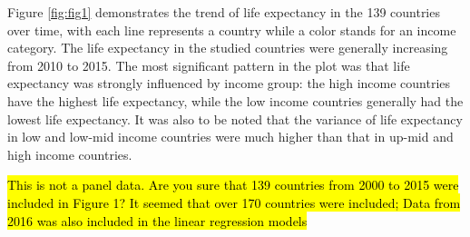 \documentclass[]{elsarticle} %
\begin{document}
Figure \ref{fig:fig1} demonstrates the trend of life expectancy in the 139 countries over time, with each line represents a country while a color stands for an income category. The life expectancy in the studied countries were generally increasing from 2010 to 2015. The most significant pattern in the plot was that life expectancy was strongly influenced by income group: the high income countries have the highest life expectancy, while the low income countries generally had the lowest life expectancy. It was also to be noted that the variance of life expectancy in low and low-mid income countries were much higher than that in up-mid and high income countries.

\begin{table}[t]

\caption{\label{tab:unnamed-chunk-2}Descrptive statistics (2000-2016)}
\centering
{}
\end{table}

\hl{This is not a panel data. Are you sure that 139 countries from 2000 to 2015 were included in Figure 1? It seemed that over 170 countries were included; Data from 2016 was also included in the linear regression models}
\end{document}

